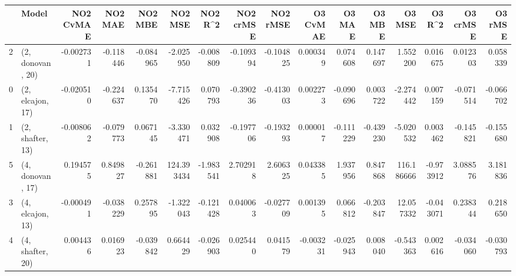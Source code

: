 \begin{tabular}{llrrrrrrrrrrrrrr}
\toprule
{} &             Model &  NO2 CvMAE &   NO2 MAE &   NO2 MBE &     NO2 MSE &   NO2 R\textasciicircum2 &  NO2 crMSE &  NO2 rMSE &  O3 CvMAE &    O3 MAE &    O3 MBE &      O3 MSE &    O3 R\textasciicircum2 &  O3 crMSE &   O3 rMSE \\
\midrule
2 &  (2, donovan, 20) &  -0.002731 & -0.118446 & -0.084965 &   -2.025950 & -0.008809 &  -0.109394 & -0.104825 &  0.000349 &  0.074608 &  0.147697 &    1.552200 &  0.016675 &  0.012303 &  0.058339 \\
0 &  (2, elcajon, 17) &  -0.020510 & -0.224637 &  0.135470 &   -7.715426 &  0.070793 &  -0.390236 & -0.413003 &  0.002273 & -0.090696 &  0.003722 &   -2.274442 &  0.007159 & -0.071514 & -0.066702 \\
1 &  (2, shafter, 13) &  -0.008062 & -0.079773 &  0.067145 &   -3.330471 &  0.032908 &  -0.197706 & -0.193293 &  0.000017 & -0.111229 & -0.439230 &   -5.020532 &  0.003462 & -0.145821 & -0.155680 \\
5 &  (4, donovan, 17) &   0.194575 &  0.849827 & -0.261881 &  124.393434 & -1.983541 &   2.702918 &  2.606325 &  0.043385 &  1.937956 &  0.847868 &  116.186666 & -0.973912 &  3.088576 &  3.181836 \\
3 &  (4, elcajon, 13) &  -0.000491 & -0.038229 &  0.257895 &   -1.322043 & -0.121428 &   0.040063 & -0.027709 &  0.001395 &  0.066812 & -0.203847 &   12.057332 & -0.043071 &  0.238344 &  0.218650 \\
4 &  (4, shafter, 20) &   0.004436 &  0.016923 & -0.039842 &    0.664429 & -0.026903 &   0.025440 &  0.041579 & -0.003231 & -0.025943 &  0.008040 &   -0.543363 &  0.002616 & -0.034060 & -0.030793 \\
\bottomrule
\end{tabular}
